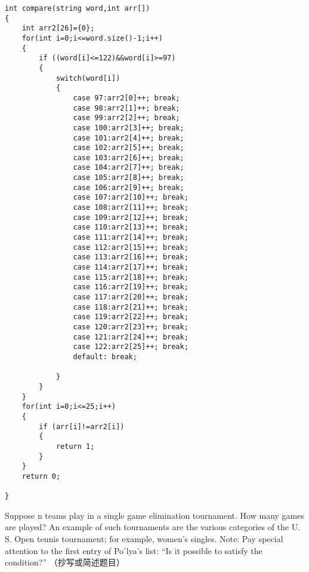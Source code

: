 \documentclass[11pt, a4paper, UTF8]{ctexart}
\begin{document}
\begin{solution}
\begin{verbatim}
                                              
                                        
                                              
int compare(string word,int arr[])
{
    int arr2[26]={0};
    for(int i=0;i<=word.size()-1;i++)
    {
        if ((word[i]<=122)&&word[i]>=97)
        {
            switch(word[i])
            {
                case 97:arr2[0]++; break;
                case 98:arr2[1]++; break;
                case 99:arr2[2]++; break;
                case 100:arr2[3]++; break;
                case 101:arr2[4]++; break;
                case 102:arr2[5]++; break;
                case 103:arr2[6]++; break;
                case 104:arr2[7]++; break;
                case 105:arr2[8]++; break;
                case 106:arr2[9]++; break;
                case 107:arr2[10]++; break;
                case 108:arr2[11]++; break;
                case 109:arr2[12]++; break;
                case 110:arr2[13]++; break;
                case 111:arr2[14]++; break;
                case 112:arr2[15]++; break;
                case 113:arr2[16]++; break;
                case 114:arr2[17]++; break;
                case 115:arr2[18]++; break;
                case 116:arr2[19]++; break;
                case 117:arr2[20]++; break;
                case 118:arr2[21]++; break;
                case 119:arr2[22]++; break;
                case 120:arr2[23]++; break;
                case 121:arr2[24]++; break;
                case 122:arr2[25]++; break;
                default: break;
                    
            }
        }
    }
    for(int i=0;i<=25;i++)
    {
        if (arr[i]!=arr2[i])
        {
            return 1;
        }
    }
    return 0;
        
}
\end{verbatim}
\end{solution}

\begin{problem}[UD: 1.4]	%
  Suppose n teams play in a single game elimination tournament. How many games are played?
An example of such tournaments are the various categories of the U. S. Open tennis tournament; for example, women’s singles.
Note: Pay special attention to the first entry of Po ́lya’s list: “Is it possible to satisfy the condition?”
 （抄写或简述题目）
\end{problem}

\begin{remark}	%
  
\end{remark}
\end{document}

